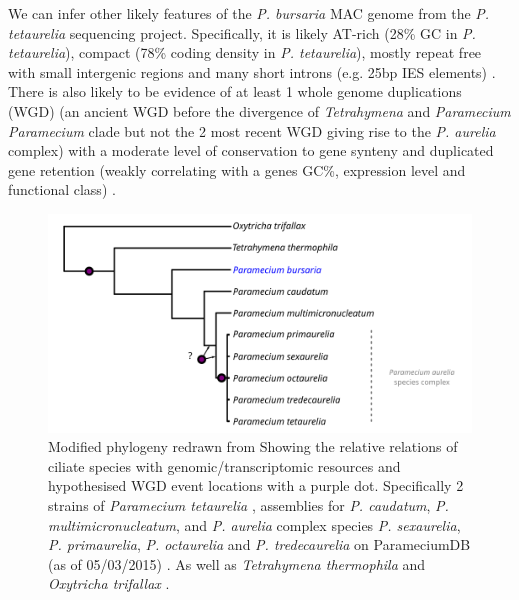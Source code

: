 We can infer other likely features of the \textit{P. bursaria} MAC genome from the \textit{P. tetaurelia} sequencing project.
Specifically, it is likely AT-rich (28\% GC in \textit{P. tetaurelia}), compact (78\% coding density in \textit{P. tetaurelia}),
mostly repeat free with small intergenic regions and many short introns (e.g. 25bp IES elements) \citep{Aury2006}.  
There is also likely to be evidence of at least 1 whole genome duplications (WGD) (an ancient WGD before the divergence of \textit{Tetrahymena} and \textit{Paramecium} \textit{Paramecium} clade but not the 2 most recent WGD giving rise to the \textit{P. aurelia} complex) with a moderate level of conservation to gene synteny and duplicated gene retention (weakly correlating with a genes GC\%, expression level and functional class) \citep{Aury2006,McGrath2014}.


\begin{figure}[h!]
    \includegraphics[width=\textwidth]{paramecium_genomes.svg}
    \caption{Modified phylogeny redrawn from \citep{Fokin2004,Aury2006,McGrath2014}
             Showing the relative relations of ciliate species with genomic/transcriptomic resources and hypothesised WGD event locations with a purple dot.
             Specifically 2 strains of \textit{Paramecium tetaurelia} \citep{Aury2006}, assemblies for 
             \textit{P. caudatum}, \textit{P. multimicronucleatum}, and \textit{P. aurelia} complex species \textit{P. sexaurelia},
             \textit{P. primaurelia}, \textit{P. octaurelia} and \textit{P. tredecaurelia} on ParameciumDB (as of 05/03/2015) \citep{Arnaiz2011}.
         As well as \textit{Tetrahymena thermophila} \citep{Eisen2006} and \textit{Oxytricha trifallax} \citep{Swart2013}.}
\end{figure}

